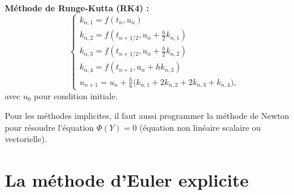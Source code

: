 \documentclass[a4paper,12pt,reqno]{amsart}
\begin{document}
{\bf M\'ethode de Runge-Kutta (RK4) :}
\smallskip
$$\left\{
\begin{array}{l}
k_{n,1}=f(t_n,u_n)\\
k_{n,2}=f(t_{n+1/2},u_n+\frac{h}{2}k_{n,1})\\[0.2cm]
k_{n,3}=f(t_{n+1/2},u_n+\frac{h}{2} k_{n,2})\\[0.2cm]
k_{n,4}=f(t_{n+1},u_n+h k_{n,3})\\[0.2cm]
u_{n+1}=u_n+\frac{h}{6}\bigl( k_{n,1}+2 k_{n,2}+2 k_{n,3}+k_{n,4}\bigl),
\end{array}\right.
$$
avec $u_0$ pour condition initiale.

Pour les m\'ethodes implicites, il faut aussi programmer la m\'ethode de Newton pour r\'esoudre l'\'equation 
$\Phi (Y) = 0$ (\'equation non lin\'eaire scalaire ou vectorielle).

\section{La m\'ethode d'Euler explicite }
\end{document}
